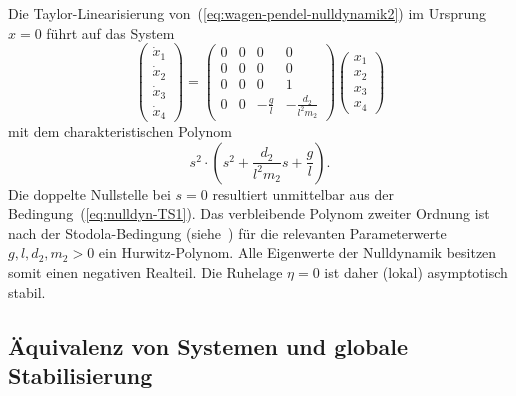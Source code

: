 \begin{example}
Die Taylor-Linearisierung von~(\ref{eq:wagen-pendel-nulldynamik2})
im Ursprung $x=0$ führt auf das System
\[
\left(\begin{array}{c}
\dot{x}_{1}\\
\dot{x}_{2}\\
\dot{x}_{3}\\
\dot{x}_{4}
\end{array}\right)=\left(\begin{array}{cccc}
0 & 0 & 0 & 0\\
0 & 0 & 0 & 0\\
0 & 0 & 0 & 1\\
0 & 0 & -\frac{g}{l} & -\frac{d_{2}}{l^{2}m_{2}}
\end{array}\right)\left(\begin{array}{l}
x_{1}\\
x_{2}\\
x_{3}\\
x_{4}
\end{array}\right)
\]
mit dem charakteristischen Polynom 
\[
s^{2}\cdot\left(s^{2}+\frac{d_{2}}{l^{2}m_{2}}s+\frac{g}{l}\right).
\]
Die doppelte Nullstelle bei $s=0$ resultiert unmittelbar aus der
Bedingung~(\ref{eq:nulldyn-TS1}). Das verbleibende Polynom zweiter
Ordnung ist nach der Stodola-Bedingung (siehe~\cite{reinschke2014buch})
für die relevanten Parameterwerte $g,l,d_{2},m_{2}>0$ ein Hurwitz-Polynom.
Alle Eigenwerte der Nulldynamik besitzen somit einen negativen Realteil.
Die Ruhelage $\eta=0$ ist daher (lokal) asymptotisch stabil. 
\end{example}

\subsection{Äquivalenz von Systemen und globale Stabilisierung\label{subsec:Equivalenz-globale-Stab}}

